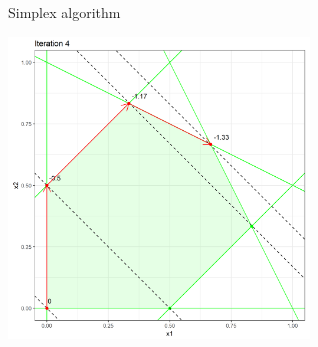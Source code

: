 \begin{vbframe}{Simplex algorithm}
\framebreak

\begin{center}
\includegraphics[width = 0.6\textwidth]{figure_man/simplex_implementation/iter4.png}
\end{center}

\end{vbframe}

%

\endlecture



